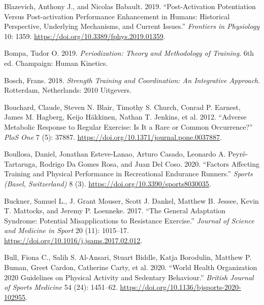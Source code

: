 \documentclass[
  letterpaper,
  DIV=11,
  numbers=noendperiod]{scrreprt}
\newlength{\cslhangindent}
\newenvironment{CSLReferences}[2] %
 {\begin{list}{}{%
  \setlength{\itemindent}{0pt}
  \setlength{\leftmargin}{0pt}
  \setlength{\parsep}{0pt}
  \ifodd #1
   \setlength{\leftmargin}{\cslhangindent}
   \setlength{\itemindent}{-1\cslhangindent}
  \fi
  \setlength{\itemsep}{#2\baselineskip}}}
 {\end{list}}
\begin{document}
\begin{CSLReferences}{1}{0}
Blazevich, Anthony J., and Nicolas Babault. 2019. {``Post-Activation
{Potentiation Versus Post-activation Performance Enhancement} in
{Humans}: {Historical Perspective}, {Underlying Mechanisms}, and
{Current Issues}.''} \emph{Frontiers in Physiology} 10: 1359.
\url{https://doi.org/10.3389/fphys.2019.01359}.

Bompa, Tudor O. 2019. \emph{Periodization: {Theory} and {Methodology} of
{Training}}. 6th ed. Champaign: Human Kinetics.

Bosch, Frans. 2018. \emph{Strength Training and Coordination: An
Integrative Approach}. Rotterdam, Netherlands: 2010 Uitgevers.

Bouchard, Claude, Steven N. Blair, Timothy S. Church, Conrad P. Earnest,
James M. Hagberg, Keijo Häkkinen, Nathan T. Jenkins, et al. 2012.
{``Adverse Metabolic Response to Regular Exercise: Is It a Rare or
Common Occurrence?''} \emph{PloS One} 7 (5): 37887.
\url{https://doi.org/10.1371/journal.pone.0037887}.

Boullosa, Daniel, Jonathan Esteve-Lanao, Arturo Casado, Leonardo A.
Peyré-Tartaruga, Rodrigo Da Gomes Rosa, and Juan Del Coso. 2020.
{``Factors {Affecting Training} and {Physical Performance} in
{Recreational Endurance Runners}.''} \emph{Sports (Basel, Switzerland)}
8 (3). \url{https://doi.org/10.3390/sports8030035}.

Buckner, Samuel L., J. Grant Mouser, Scott J. Dankel, Matthew B. Jessee,
Kevin T. Mattocks, and Jeremy P. Loenneke. 2017. {``The {General
Adaptation Syndrome}: {Potential} Misapplications to Resistance
Exercise.''} \emph{Journal of Science and Medicine in Sport} 20 (11):
1015--17. \url{https://doi.org/10.1016/j.jsams.2017.02.012}.

Bull, Fiona C., Salih S. Al-Ansari, Stuart Biddle, Katja Borodulin,
Matthew P. Buman, Greet Cardon, Catherine Carty, et al. 2020. {``World
{Health Organization} 2020 Guidelines on Physical Activity and Sedentary
Behaviour.''} \emph{British Journal of Sports Medicine} 54 (24):
1451--62. \url{https://doi.org/10.1136/bjsports-2020-102955}.


\end{CSLReferences}
\end{document}
